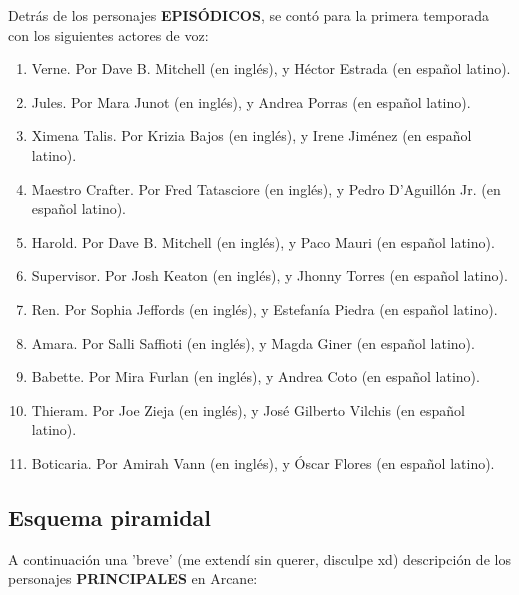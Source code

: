 \documentclass[11pt,a5paper]{article}
\begin{document}
Detrás de los personajes {\textbf{EPISÓDICOS}}, se contó para la primera temporada con los siguientes actores de voz:

\begin{enumerate}
    \item Verne. Por Dave B. Mitchell (en inglés), y Héctor Estrada (en español latino).
    \item Jules. Por Mara Junot (en inglés), y Andrea Porras (en español latino).
    \item Ximena Talis. Por Krizia Bajos (en inglés), y Irene Jiménez (en español latino).
    \item Maestro Crafter. Por Fred Tatasciore	 (en inglés), y Pedro D'Aguillón Jr. (en español latino).
    \item Harold. Por Dave B. Mitchell (en inglés), y Paco Mauri (en español latino).
    \item Supervisor. Por Josh Keaton (en inglés), y Jhonny Torres (en español latino).
    \item Ren. Por Sophia Jeffords (en inglés), y Estefanía Piedra (en español latino).
    \item Amara. Por Salli Saffioti (en inglés), y Magda Giner (en español latino).
    \item Babette. Por Mira Furlan (en inglés), y Andrea Coto (en español latino).
    \item Thieram. Por Joe Zieja (en inglés), y José Gilberto Vilchis (en español latino).
    \item Boticaria. Por Amirah Vann (en inglés), y Óscar Flores (en español latino).
\end{enumerate}

    \subsection*{{\large{\textsf{\hspace{1cm}Esquema piramidal}}}}

A continuación una 'breve' (me extendí sin querer, disculpe xd) descripción de los personajes {\textbf{PRINCIPALES}} en Arcane:
\end{document}
